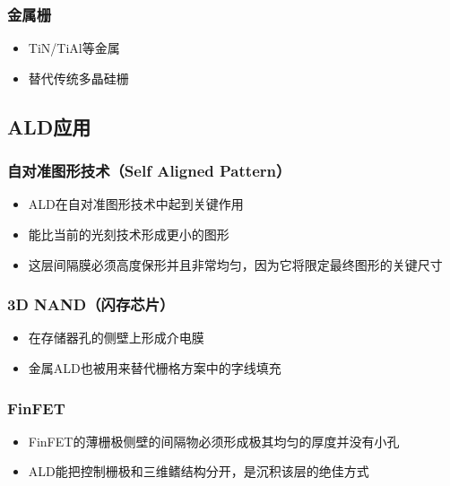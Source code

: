 \documentclass[UTF8,12pt,a4paper]{ctexart}
\begin{document}
\subsubsection{金属栅}

\begin{itemize}
    \item TiN/TiAl等金属
    \item 替代传统多晶硅栅
\end{itemize}

\subsection{ALD应用}

\subsubsection{自对准图形技术（Self Aligned Pattern）}

\begin{itemize}
    \item ALD在自对准图形技术中起到关键作用
    \item 能比当前的光刻技术形成更小的图形
    \item 这层间隔膜必须高度保形并且非常均匀，因为它将限定最终图形的关键尺寸
\end{itemize}

\subsubsection{3D NAND（闪存芯片）}

\begin{itemize}
    \item 在存储器孔的侧壁上形成介电膜
    \item 金属ALD也被用来替代栅格方案中的字线填充
\end{itemize}

\subsubsection{FinFET}

\begin{itemize}
    \item FinFET的薄栅极侧壁的间隔物必须形成极其均匀的厚度并没有小孔
    \item ALD能把控制栅极和三维鳍结构分开，是沉积该层的绝佳方式
\end{itemize}

\newpage
\end{document}
